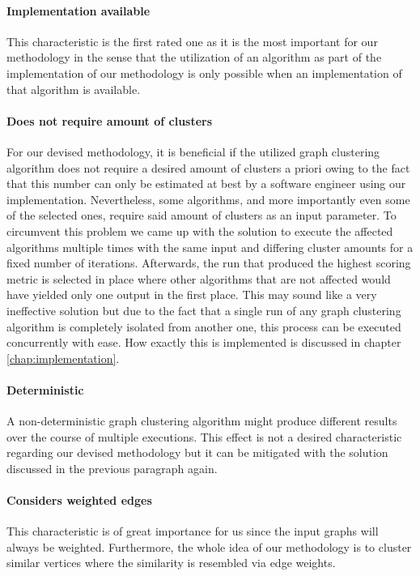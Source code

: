 \documentclass[12pt,a4paper]{report}
\begin{document}
\paragraph{Implementation available}
This characteristic is the first rated one as it is the most important for our
methodology in the sense that the utilization of an algorithm as part of
the implementation of our methodology is only possible when an implementation
of that algorithm is available.

\paragraph{Does not require amount of clusters} \label{graph-clustering-algorithm-survey-amount-of-clusters}
For our devised methodology, it is beneficial if the utilized graph clustering
algorithm does not require a desired amount of clusters a priori owing to
the fact that this number can only be estimated at best by a software engineer
using our implementation.
Nevertheless, some algorithms, and more importantly even some of the selected ones,
require said amount of clusters as an input parameter.
To circumvent this problem we came up with the solution to execute the affected
algorithms multiple times with the same input and differing cluster amounts
for a fixed number of iterations. Afterwards, the run that produced the highest
scoring metric is selected in place where other algorithms that are not affected
would have yielded only one output in the first place.
This may sound like a very ineffective solution but due to the fact that
a single run of any graph clustering algorithm is completely isolated from
another one, this process can be executed concurrently with ease.
How exactly this is implemented is discussed in chapter \ref{chap:implementation}.

\paragraph{Deterministic}
A non\hyp deterministic graph clustering algorithm might produce different
results over the course of multiple executions. This effect is not a desired
characteristic regarding our devised methodology but it can be mitigated
with the solution discussed in the previous paragraph again.

\paragraph{Considers weighted edges}
This characteristic is of great importance for us since the input graphs
will always be weighted. Furthermore, the whole idea of our methodology
is to cluster similar vertices where the similarity is resembled via edge weights.
\end{document}
